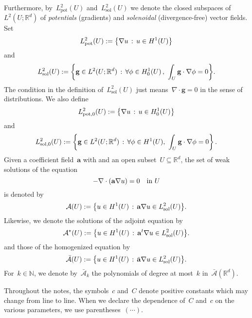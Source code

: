 \documentclass[11pt,twoside]{article} %
\numberwithin{equation}{section}
\theoremstyle{definition}
\let\originalleft\left
\let\originalright\right
\renewcommand{\left}{\mathopen{}\mathclose\bgroup\originalleft}
\renewcommand{\right}{\aftergroup\egroup\originalright}
\newcommand*{\N}{\ensuremath{\mathbb{N}}}
\newcommand*{\Rd}{\ensuremath{\mathbb{R}^d}}
\newcommand{\g}{\mathbf{g}}
\renewcommand{\a}{\mathbf{a}}
\newcommand{\ahom}{\bar{\a}}
\newcommand{\A}{\mathcal{A}}
\newcommand{\Ahom}{\bar{\A}}
\newcommand{\Lsol}{L^2_{\mathrm{sol}}}
\newcommand{\Lsolo}{L^2_{\mathrm{sol,0}}}
\newcommand{\Lpot}{L^2_{\mathrm{pot}}}
\newcommand{\Lpoto}{L^2_{\mathrm{pot,0}}}
\begin{document}
Furthermore, by~$\Lpot(U)$ and~$\Lsol(U)$ we denote the closed subspaces of~$L^2(U;\Rd)$ 
of \emph{potentials} (gradients) and \emph{solenoidal} (divergence-free) vector fields. Set 
\begin{equation}
\label{e.Lpot.not}
\Lpot(U):= \left\{ \nabla u \,:\,  u \in H^1(U) \right\}
\end{equation}
and
\begin{equation}
\label{e.Ls.not}
\Lsol(U):= \left\{ \g \in L^2(U;\Rd) \,:\,  \forall \phi\in H^1_0(U)  \,, \ \int_U \g\cdot \nabla \phi = 0 \right\}.
\end{equation}
The condition in the definition of~$\Lsol(U)$ just means~$\nabla \cdot \g = 0$ in the sense of distributions.  We also define 
\begin{equation} 
\label{e.def.Lp0}
\Lpoto(U):= \left\{ \nabla u \,:\, u\in H^1_0(U) \right\}
\end{equation}
and
\begin{equation}
\label{e.def.Ls0}
\Lsolo(U):= \left\{ \g \in L^2(U;\Rd) \,:\, \forall \phi\in H^1(U), \ \int_U \g\cdot \nabla \phi = 0 \right\}
\,.
\end{equation}
Given a coefficient field~$\a$ with  and an open subset~$U\subseteq \Rd$, the set of weak solutions of the equation
\begin{equation*} \label{}
-\nabla \cdot \left( \a\nabla u \right)  = 0 \quad \mbox{in} \ U
\end{equation*}
is denoted by 
\begin{equation} \label{e.def.A(U)}
\A(U) := \left\{ u\in H^1(U)\,:\,\a\nabla u \in L^2_{\mathrm{sol}}(U) \right\}.
\end{equation}
Likewise, we denote the solutions of the adjoint equation by 
\begin{equation} \label{e.def.A.t(U)}
\A^*(U) := \left\{ u\in H^1(U)\,:\,\a^t\nabla u \in L^2_{\mathrm{sol}}(U) \right\}.
\end{equation}
and those of the homogenized equation by
\begin{equation} \label{e.def.Ahom(U)}
\Ahom(U) := \left\{ u\in H^1(U)\,:\,\ahom\nabla u \in L^2_{\mathrm{sol}}(U) \right\}.
\end{equation}
For~$k \in \N$, we denote by~$\Ahom_{k}$ the polynomials of degree at most~$k$ in~$\Ahom(\Rd)$. 

\smallskip

Throughout the notes, the symbols~$c$ and~$C$ denote positive constants which may change from line to line. When we declare the dependence of~$C$ and~$c$ on the various parameters, we use parentheses~$(\cdots)$. 
\end{document}
